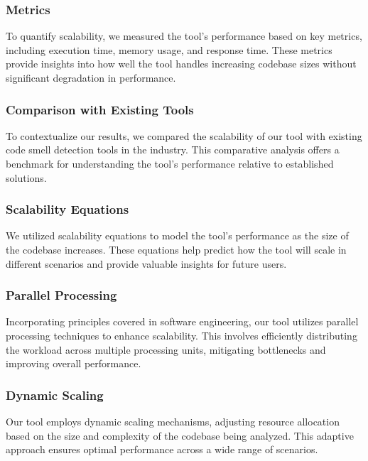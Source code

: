 \documentclass[journal]{IEEEtran}
\begin{document}
\subsubsection{Metrics}

To quantify scalability, we measured the tool's performance based on key metrics, including execution time, memory usage, and response time. These metrics provide insights into how well the tool handles increasing codebase sizes without significant degradation in performance.

\subsubsection{Comparison with Existing Tools}

To contextualize our results, we compared the scalability of our tool with existing code smell detection tools in the industry. This comparative analysis offers a benchmark for understanding the tool's performance relative to established solutions.

\subsubsection{Scalability Equations}

We utilized scalability equations to model the tool's performance as the size of the codebase increases. These equations help predict how the tool will scale in different scenarios and provide valuable insights for future users.

\subsubsection{Parallel Processing}

Incorporating principles covered in software engineering, our tool utilizes parallel processing techniques to enhance scalability. This involves efficiently distributing the workload across multiple processing units, mitigating bottlenecks and improving overall performance.

\subsubsection{Dynamic Scaling}

Our tool employs dynamic scaling mechanisms, adjusting resource allocation based on the size and complexity of the codebase being analyzed. This adaptive approach ensures optimal performance across a wide range of scenarios.
\end{document}
